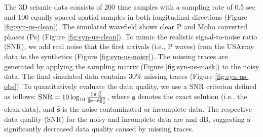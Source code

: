 The 3D seismic data consists of 200 time samples with a sampling rate of 0.5 sec and 100 equally spaced spatial samples in both longitudinal  directions (Figure \ref{fig:syn-us-clean}).  The simulated wavefield shows clear P and Moho converted phases (Ps) (Figure \ref{fig:syn-us-clean}). To mimic the realistic signal-to-noise ratio (SNR), we add real noise that  the first arrivals (i.e., P waves) from the USArray data to the synthetics (Figure \ref{fig:syn-us-noisy}). The missing traces are generated by applying the sampling matrix (Figure \ref{fig:syn-us-mask}) to the noisy data. The final simulated data contains 30\% missing traces (Figure \ref{fig:syn-us-obs}). To quantitatively evaluate the data quality, we use a SNR criterion defined as follows: $\text{SNR}=10\log_{10}\frac{\Arrowvert \mathbf{s} \Arrowvert_2^2}{\Arrowvert \mathbf{s} -\hat{\mathbf{s}}\Arrowvert_2^2}$, where $\mathbf{s}$ denotes the exact solution (i.e., the clean data), and $\hat{\mathbf{s}}$ is the noise contaminated or incomplete data. The respective data quality  (SNR) for the noisy and  incomplete data are  and  dB, suggesting a significantly decreased data quality caused by missing traces. 

